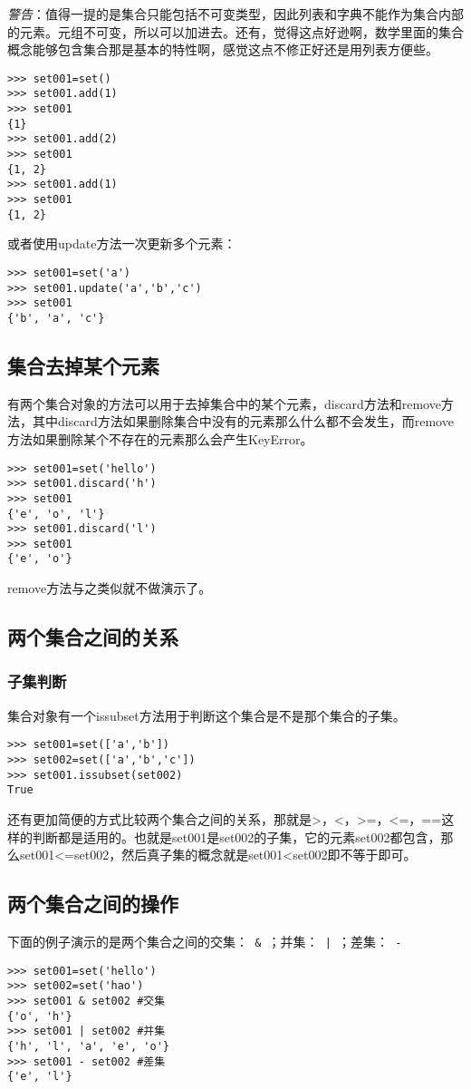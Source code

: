 \documentclass[12pt,oneside]{book}
\begin{document}
\begin{common-format}
\emph{警告}：值得一提的是集合只能包括不可变类型，因此列表和字典不能作为集合内部的元素。元组不可变，所以可以加进去。还有，觉得这点好逊啊，数学里面的集合概念能够包含集合那是基本的特性啊，感觉这点不修正好还是用列表方便些。

\begin{Verbatim}
>>> set001=set()
>>> set001.add(1)
>>> set001
{1}
>>> set001.add(2)
>>> set001
{1, 2}
>>> set001.add(1)
>>> set001
{1, 2}
\end{Verbatim}

或者使用update方法一次更新多个元素：
\begin{Verbatim}
>>> set001=set('a')
>>> set001.update('a','b','c')
>>> set001
{'b', 'a', 'c'}
\end{Verbatim}


\subsection{集合去掉某个元素}
有两个集合对象的方法可以用于去掉集合中的某个元素，discard方法和remove方法，其中discard方法如果删除集合中没有的元素那么什么都不会发生，而remove方法如果删除某个不存在的元素那么会产生KeyError。

\begin{Verbatim}
>>> set001=set('hello')
>>> set001.discard('h')
>>> set001
{'e', 'o', 'l'}
>>> set001.discard('l')
>>> set001
{'e', 'o'}
\end{Verbatim}

remove方法与之类似就不做演示了。

\subsection{两个集合之间的关系}

\subsubsection{子集判断}
集合对象有一个issubset方法用于判断这个集合是不是那个集合的子集。
\begin{Verbatim}
>>> set001=set(['a','b'])
>>> set002=set(['a','b','c'])
>>> set001.issubset(set002)
True
\end{Verbatim}

还有更加简便的方式比较两个集合之间的关系，那就是>，<，>=，<=，==这样的判断都是适用的。也就是set001是set002的子集，它的元素set002都包含，那么set001<=set002，然后真子集的概念就是set001<set002即不等于即可。


\subsection{两个集合之间的操作}
下面的例子演示的是两个集合之间的交集：\verb+ & +；并集：\verb+ | +；差集：\verb+ - +
\begin{Verbatim}
>>> set001=set('hello')
>>> set002=set('hao')
>>> set001 & set002 #交集
{'o', 'h'}
>>> set001 | set002 #并集
{'h', 'l', 'a', 'e', 'o'}
>>> set001 - set002 #差集
{'e', 'l'}
\end{Verbatim}



\end{common-format}
\end{document}
